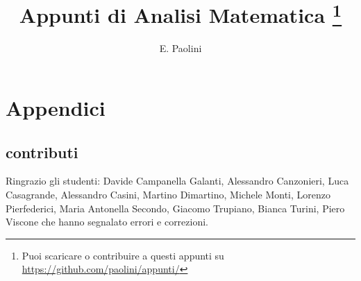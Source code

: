 \documentclass[italian,a4paper,oneside,headinclude]{scrbook}
\title{Appunti di Analisi Matematica%
\thanks{%
Puoi scaricare o contribuire a questi appunti su
\url{https://github.com/paolini/appunti/}}}
\author{E. Paolini}
\begin{document}
\maketitle

\tableofcontents













\backmatter
\chapter{Appendici}

\section{contributi}

Ringrazio gli studenti:
%
Davide Campanella Galanti,
Alessandro Canzonieri,
Luca Casagrande,
Alessandro Casini,
Martino Dimartino,
Michele Monti,
Lorenzo Pierfederici,
Maria Antonella Secondo,
Giacomo Trupiano,
Bianca Turini,
Piero Viscone
%
che hanno segnalato errori e correzioni.

\nocite{Giusti}
\nocite{Courant}
\nocite{Marcellini}




\printindex
\end{document}
